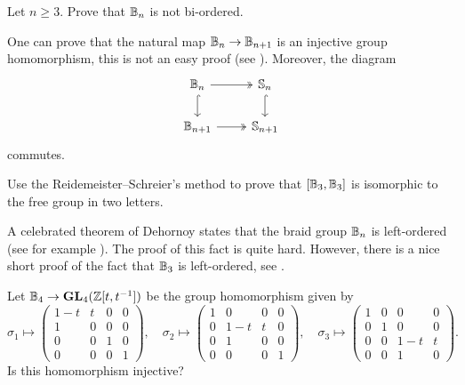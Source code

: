 \begin{exercise}
\label{xca:Bn_notBO}
    Let $n\geq3$. 
    Prove that $\mathbb{B}_n$ is not bi-ordered. 
\end{exercise}

One can prove that 
the natural map $\mathbb{B}_n\to\mathbb{B}_{n+1}$ is an injective group homomorphism, this is not an easy proof (see \cite[Corollary 1.14]{MR2435235}). Moreover,
the diagram
\[\begin{tikzcd}
	\B_n & \Sym_n \\
	\B_{n+1} & \Sym_{n+1}
	\arrow[two heads, from=1-1, to=1-2]
	\arrow[hook, from=1-2, to=2-2]
	\arrow[hook, from=1-1, to=2-1]
	\arrow[two heads, from=2-1, to=2-2]
\end{tikzcd}
\]
commutes. 

\begin{exercise}
\label{xca:derivedB3}
    Use the Reidemeister--Schreier's method to prove that 
    $[\mathbb{B}_3,\mathbb{B}_3]$ is isomorphic to the free group in two letters.
\end{exercise}

A celebrated theorem of Dehornoy states that the braid group $\mathbb{B}_n$ 
is left-ordered (see for example \cite[Theorem 7.15]{MR2435235}). The proof of this fact is quite hard. However, 
there is a nice short proof of the fact that 
$\mathbb{B}_3$ is left-ordered, see 
\cite[\S7.2]{MR3560661}.

\begin{problem}
    Let $\mathbb{B}_4\to\mathbf{GL}_4(\mathbb{Z}[t,t^{-1}])$ be the group 
    homomorphism given by
    \[
    \sigma_1\mapsto\begin{pmatrix}
    1-t&t&0&0\\
    1&0&0&0\\
    0&0&1&0\\
    0&0&0&1
    \end{pmatrix},
    \quad
    \sigma_2\mapsto\begin{pmatrix}
    1&0&0&0\\
    0&1-t&t&0\\
    0&1&0&0\\
    0&0&0&1
    \end{pmatrix},
    \quad
    \sigma_3\mapsto\begin{pmatrix}
    1&0&0&0\\
    0&1&0&0\\
    0&0&1-t&t\\
    0&0&1&0
    \end{pmatrix}.
    \]
    Is this homomorphism injective?
\end{problem}

